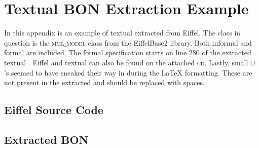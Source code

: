 \chapter{Textual BON Extraction Example}
In this appendix is an example of textual \bon{} extracted from Eiffel. The class in question is the \textsc{mml$\_$model} class from the EiffelBase2 library. Both informal and formal \bon are included. The formal \bon{} specification starts on line 280 of the extracted textual \bon{}. Eiffel and textual \bon{} can also be found on the attached \textsc{cd}. Lastly, small $\cup$'s seemed to have sneaked their way in during the \LaTeX{} formatting. These are not present in the extracted \bon{} and should be replaced with spaces.
\section{Eiffel Source Code}
\label{appendix-bon-extraction-example}
\lstset{
basicstyle=\ttfamily\scriptsize,
language=Eiffel,
numbers=left
}

\break
\section{Extracted BON}
\lstset{
basicstyle=\ttfamily\scriptsize,
numbers=left
}

